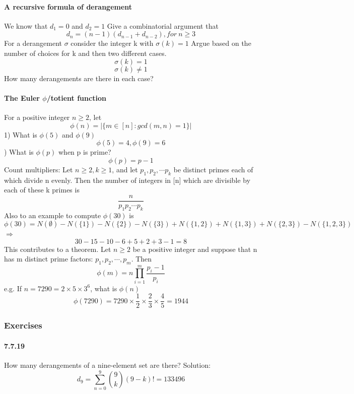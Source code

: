 \documentclass{article}
\begin{document}
\paragraph{A recursive formula of derangement}
We know that $d_1=0$ and $d_2=1$\newline
Give a combinatorial argument that
$$d_n=(n-1)(d_{n-1}+d_{n-2}), for \ n\ge 3$$
For a derangement $\sigma$  consider the integer k with $\sigma (k)=1$\newline
Argue based on the number of choices for k and then two different cases.\newline
$$\sigma (k)=1$$
$$\sigma (k)\neq 1$$
How many derangements are there in each case?
\paragraph{The Euler $\phi$/totient function}
For a positive integer $n \ge 2$, let
$$\phi (n)=|\{m\in [n]:gcd(m,n)=1\}|$$
1) What is $\phi (5)$ and $\phi (9)$\newline
$$\phi (5)=4, \phi(9)=6$$) What is $\phi (p)$ when p is prime?\newline
$$\phi(p)=p-1$$\newline
Count multipliers:\newline
Let $n\ge 2,k\ge 1$, and let $p_1,p_2,\cdots p_k$ be distinct primes each of which divide n evenly.\newline
Then the number of integers in [n] which are divisible by each of these k primes is
$$\frac{n}{p_1 p_2 \cdots p_k}$$
Also to an example to compute $\phi (30)$ is 
$$\phi (30)=N(\emptyset)-N(\{1\})-N(\{2\})-N(\{3\})+N(\{1,2\})+N(\{1,3\})+N(\{2,3\})-N(\{1,2,3\})$$
$\Longrightarrow$
$$30-15-10-6+5+2+3-1=8$$
This contributes to a theorem.\newline
Let $n\ge 2$ be a positive integer and suppose that n has m distinct prime factors: $p_1,p_2,\cdots,p_m$. Then
$$\phi (m)=n\prod_{i=1}^m\frac{p_i-1}{p_i}$$
e.g. If $n=7290=2\times 5\times 3^6$, what is $\phi (n)$
$$\phi(7290)=7290\times \frac{1}{2} \times \frac{2}{3} \times \frac{4}{5}=1944$$
\subsubsection{Exercises}
\paragraph{7.7.19}
How many derangements of a nine-element set are there?\newline
Solution:\newline
$$d_9=\sum_{n=0}^9\binom{9}{k}(9-k)!=133496$$
\end{document}

